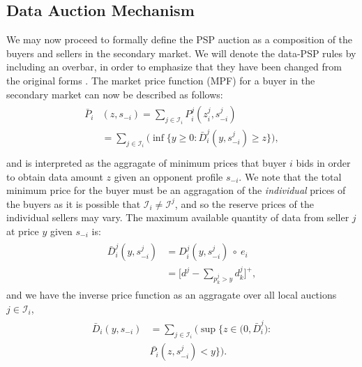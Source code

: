 \documentclass[12pt]{article}
\theoremstyle{definition}
\newcommand{\vs}{\varsigma}
\newcommand{\mcI}{\mathcal{I}}
\begin{document}
\begin{multicols}{2}
\subsection{Data Auction Mechanism}\label{mechanism}
We may now proceed to formally define the PSP auction as a composition of the
buyers and sellers in the secondary market. We will denote the data-PSP rules
by including an overbar, in order to emphasize that they have been changed from
the original forms \cite{lazar}.
The market price function (MPF) for a buyer in the secondary market
can now be described as follows:
\begin{align}\label{dataprice}
\begin{split}
    \bar{P}_i&(z, s_{-i}) =\displaystyle\sum_{j\in\mcI_i}P_i^j(z_i^j,
s_{-i}^j) \\
    &= \sum_{j\in\mcI_i}\bigg(\inf\bigg\lbrace y\ge 0 : 
    {\bar{D}_i^j}(y,s_{-i}^j) \ge z\bigg\rbrace \bigg),\\
\end{split}
\end{align}
and is interpreted as the aggragate of minimum prices that buyer $i$ bids in
order to obtain
data amount $z$ given an opponent profile $s_{-i}$. We note that
the total minimum price for the buyer must be an aggragation of the \emph{individual} prices of the buyers as it is
possible that $\mcI_i \ne \mcI^j$, and so the reserve prices of the individual sellers
may vary. 
The maximum available quantity of data from seller
$j$ at price $y$ given $s_{-i}$ is: 
\begin{align}
\begin{split}\label{datacomposed}
    \bar{D}_i^j(y,s_{-i}^j) &= D_i^j(y,s_{-i}^j)\ \circ\ e_i\\
    &= \bigg\lbrack d^j - \sum_{p_k^j> y} d_k^j\bigg\rbrack^+,
\end{split}
\end{align}
and we have the inverse price function as an aggragate over all local auctions
$j\in \mcI_i$,
\begin{align}\label{datapriceinverse}
\begin{split}
    \bar{D}_i(y, s_{-i}) &= \displaystyle\sum_{j\in\mcI_i}\bigg(\sup\bigg\lbrace z\in \big( 0,
\bar{D}_i^j \big) : \\
    &\bar{P_i}(z,s_{-i}^j) < y\bigg\rbrace\bigg).
\end{split}

\end{align}
\end{multicols}
\end{document}
